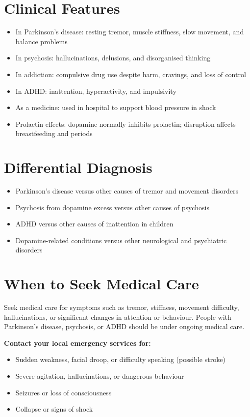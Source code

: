 \section*{Clinical Features}
\begin{itemize}
    \item In Parkinson's disease: resting tremor, muscle stiffness, slow movement, and balance problems
    \item In psychosis: hallucinations, delusions, and disorganised thinking
    \item In addiction: compulsive drug use despite harm, cravings, and loss of control
    \item In ADHD: inattention, hyperactivity, and impulsivity
    \item As a medicine: used in hospital to support blood pressure in shock
    \item Prolactin effects: dopamine normally inhibits prolactin; disruption affects breastfeeding and periods
\end{itemize}

\section*{Differential Diagnosis}
\begin{itemize}
    \item Parkinson's disease versus other causes of tremor and movement disorders
    \item Psychosis from dopamine excess versus other causes of psychosis
    \item ADHD versus other causes of inattention in children
    \item Dopamine-related conditions versus other neurological and psychiatric disorders
\end{itemize}

\section*{When to Seek Medical Care}
Seek medical care for symptoms such as tremor, stiffness, movement difficulty, hallucinations, or significant changes in attention or behaviour. People with Parkinson's disease, psychosis, or ADHD should be under ongoing medical care.

\textbf{Contact your local emergency services for:}
\begin{itemize}
    \item Sudden weakness, facial droop, or difficulty speaking (possible stroke)
    \item Severe agitation, hallucinations, or dangerous behaviour
    \item Seizures or loss of consciousness
    \item Collapse or signs of shock
\end{itemize}

